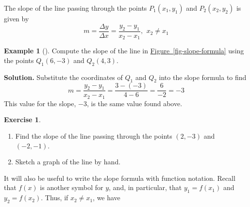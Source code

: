 \documentclass[10pt,]{book}
\theoremstyle{plain}
\theoremstyle{definition}
\newtheorem{exercise}[theorem]{Exercise}
\theoremstyle{definition}
\newtheorem{example}[theorem]{Example}
\numberwithin{equation}{section}
\begin{document}
        The slope of the line passing through the points \(P_1 (x_1, y_1)\) and \(P_2 (x_2, y_2)\) is given by
        \begin{equation*}m = \frac{\Delta y}{\Delta x}= \frac{y_2 − y_1}{x_2 − x_1} 
            \text{, }~x_2 \ne x_1\end{equation*}
\begin{example}[]\label{example-two-point-slope}
Compute the slope of the line in \hyperref[fig-slope-formula]{Figure~\ref{fig-slope-formula}} using the points \(Q_1 (6, −3)\) and \(Q_2 (4, 3)\). %
\par\medskip\noindent%
\textbf{Solution.}\quad 
        Substitute the coordinates of \(Q_1\) and \(Q_2\) into the slope formula to find
        \begin{equation*}m = \frac{y_2 − y_1}{x_2 − x_1}= \frac{3 − (−3)}{4 − 6}
        = \frac{6}{-2}= −3\end{equation*}
        This value for the slope, \(−3\), is the same value found above.
    \end{example}
\begin{exercise}\label{exercise-two-point-slope}
\leavevmode%
\begin{enumerate}[label=*\alph**]
\item\hypertarget{li-151}{}Find the slope of the line passing through the points \((2, −3)\) and \(( −2, −1)\).\item\hypertarget{li-152}{}Sketch a graph of the line by hand.\end{enumerate}
\end{exercise}

    It will also be useful to write the slope formula with function notation. Recall that \(f (x)\) is another symbol for \(y\), and, in particular, that \(y_1 = f (x_1)\) and \(y_2 = f (x_2)\). Thus, if \(x_2 \ne x_1\), we have
%
\typeout{************************************************}
\typeout{************************************************}
\end{document}
